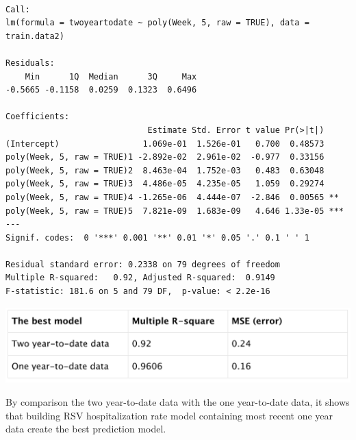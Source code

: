 \documentclass[
  letterpaper,
  DIV=11,
  numbers=noendperiod]{scrreport}
\newenvironment{Shaded}{\begin{snugshade}}{\end{snugshade}}
\newcommand{\CommentTok}[1]{\textcolor[rgb]{0.37,0.37,0.37}{#1}}
\newcommand{\FunctionTok}[1]{\textcolor[rgb]{0.28,0.35,0.67}{#1}}
\newcommand{\NormalTok}[1]{\textcolor[rgb]{0.00,0.23,0.31}{#1}}
\newcommand{\OtherTok}[1]{\textcolor[rgb]{0.00,0.23,0.31}{#1}}
\newcommand{\SpecialCharTok}[1]{\textcolor[rgb]{0.37,0.37,0.37}{#1}}
\begin{document}
\begin{verbatim}

Call:
lm(formula = twoyeartodate ~ poly(Week, 5, raw = TRUE), data = train.data2)

Residuals:
    Min      1Q  Median      3Q     Max 
-0.5665 -0.1158  0.0259  0.1323  0.6496 

Coefficients:
                             Estimate Std. Error t value Pr(>|t|)    
(Intercept)                 1.069e-01  1.526e-01   0.700  0.48573    
poly(Week, 5, raw = TRUE)1 -2.892e-02  2.961e-02  -0.977  0.33156    
poly(Week, 5, raw = TRUE)2  8.463e-04  1.752e-03   0.483  0.63048    
poly(Week, 5, raw = TRUE)3  4.486e-05  4.235e-05   1.059  0.29274    
poly(Week, 5, raw = TRUE)4 -1.265e-06  4.444e-07  -2.846  0.00565 ** 
poly(Week, 5, raw = TRUE)5  7.821e-09  1.683e-09   4.646 1.33e-05 ***
---
Signif. codes:  0 '***' 0.001 '**' 0.01 '*' 0.05 '.' 0.1 ' ' 1

Residual standard error: 0.2338 on 79 degrees of freedom
Multiple R-squared:   0.92, Adjusted R-squared:  0.9149 
F-statistic: 181.6 on 5 and 79 DF,  p-value: < 2.2e-16
\end{verbatim}

\begin{Shaded}
\end{Shaded}

\includegraphics[width=5.875in,height=\textheight]{./images/paste-09152757.png}

By comparison the two year-to-date data with the one year-to-date data,
it shows that building RSV hospitalization rate model containing most
recent one year data create the best prediction model.
\end{document}
